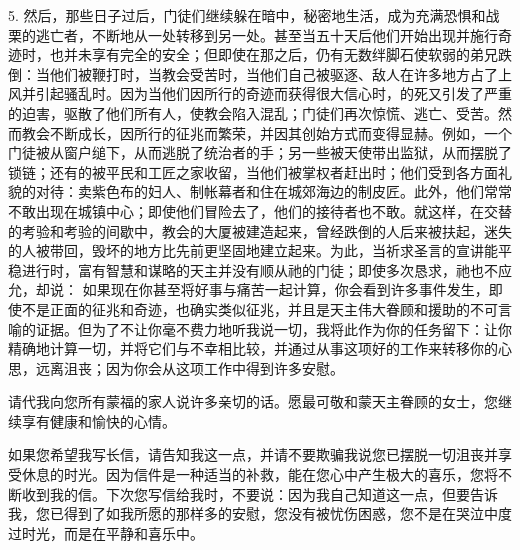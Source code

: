 5. 然后，那些日子过后，门徒们继续躲在暗中，秘密地生活，成为充满恐惧和战栗的逃亡者，不断地从一处转移到另一处。甚至当五十天后他们开始出现并施行奇迹时，也并未享有完全的安全；但即使在那之后，仍有无数绊脚石使软弱的弟兄跌倒：当他们被鞭打时，当教会受苦时，当他们自己被驱逐、敌人在许多地方占了上风并引起骚乱时。因为当他们因所行的奇迹而获得很大信心时，的死又引发了严重的迫害，驱散了他们所有人，使教会陷入混乱；门徒们再次惊慌、逃亡、受苦。然而教会不断成长，因所行的征兆而繁荣，并因其创始方式而变得显赫。例如，一个门徒被从窗户缒下，从而逃脱了统治者的手；另一些被天使带出监狱，从而摆脱了锁链；还有的被平民和工匠之家收留，当他们被掌权者赶出时；他们受到各方面礼貌的对待：卖紫色布的妇人、制帐幕者和住在城郊海边的制皮匠。此外，他们常常不敢出现在城镇中心；即使他们冒险去了，他们的接待者也不敢。就这样，在交替的考验和考验的间歇中，教会的大厦被建造起来，曾经跌倒的人后来被扶起，迷失的人被带回，毁坏的地方比先前更坚固地建立起来。为此，当祈求圣言的宣讲能平稳进行时，富有智慧和谋略的天主并没有顺从祂的门徒；即使多次恳求，祂也不应允，却说： 如果现在你甚至将好事与痛苦一起计算，你会看到许多事件发生，即使不是正面的征兆和奇迹，也确实类似征兆，并且是天主伟大眷顾和援助的不可言喻的证据。但为了不让你毫不费力地听我说一切，我将此作为你的任务留下：让你精确地计算一切，并将它们与不幸相比较，并通过从事这项好的工作来转移你的心思，远离沮丧；因为你会从这项工作中得到许多安慰。\par

请代我向您所有蒙福的家人说许多亲切的话。愿最可敬和蒙天主眷顾的女士，您继续享有健康和愉快的心情。\par

如果您希望我写长信，请告知我这一点，并请不要欺骗我说您已摆脱一切沮丧并享受休息的时光。因为信件是一种适当的补救，能在您心中产生极大的喜乐，您将不断收到我的信。下次您写信给我时，不要说：因为我自己知道这一点，但要告诉我，您已得到了如我所愿的那样多的安慰，您没有被忧伤困惑，您不是在哭泣中度过时光，而是在平静和喜乐中。\par



